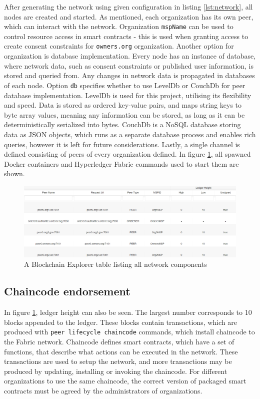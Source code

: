 \documentclass[12pt]{article}
\begin{document}
    After generating the network using given configuration in listing \ref{lst:network}, all nodes are created and started. As mentioned, each organization has its own peer, which can interact with the network. Organization \lstinline{mspName} can be used to control resource access in smart contracts - this is used when granting access to create consent constraints for \lstinline{owners.org} organization. Another option for organization is database implementation. Every node has an instance of database, where network data, such as consent constraints or published user information, is stored and queried from. Any changes in network data is propagated in databases of each node. Option \lstinline{db} specifies whether to use LevelDb or CouchDb for peer database implementation. LevelDb is used for this project, utilising its flexibility and speed. Data is stored as ordered key-value pairs, and maps string keys to byte array values, meaning any information can be stored, as long as it can be deterministically serialized into bytes. CouchDb is a NoSQL database storing data as JSON objects, which runs as a separate database process and enables rich queries, however it is left for future considerations. Lastly, a single channel is defined consisting of peers of every organization defined. In figure \ref{fig:network}, all spawned Docker containers and Hyperledger Fabric commands used to start them are shown.
    
    \begin{figure}[H]
        \includegraphics[width=\textwidth]{network.png}
        \caption{A Blockchain Explorer table listing all network components}
        \label{fig:network}
    \end{figure}


    \subsection{Chaincode endorsement}
    In figure \ref{fig:network}, ledger height can also be seen. The largest number corresponds to 10 blocks appended to the ledger. These blocks contain transactions, which are produced with \lstinline{peer lifecycle chaincode} commands, which install chaincode to the Fabric network. Chaincode defines smart contracts, which have a set of functions, that describe what actions can be executed in the network. These transactions are used to setup the network, and more transactions may be produced by updating, installing or invoking the chaincode. For different organizations to use the same chaincode, the correct version of packaged smart contracts must be agreed by the administrators of organizations.
    
\end{document}
